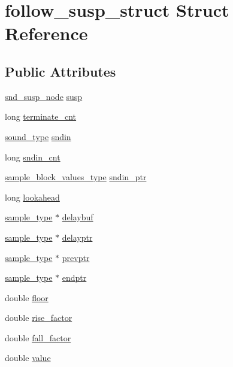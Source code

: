 \hypertarget{structfollow__susp__struct}{}\section{follow\+\_\+susp\+\_\+struct Struct Reference}
\label{structfollow__susp__struct}
\subsection*{Public Attributes}
\begin{DoxyCompactItemize}
\item 
\hyperlink{sound_8h_a6b268203688a934bd798ceb55f85d4c0}{snd\+\_\+susp\+\_\+node} \hyperlink{structfollow__susp__struct_ac51c0fb5911928ba83ecb7097f8e0eee}{susp}
\item 
long \hyperlink{structfollow__susp__struct_a77ca1631afba1cb5d86280656b045410}{terminate\+\_\+cnt}
\item 
\hyperlink{sound_8h_a792cec4ed9d6d636d342d9365ba265ea}{sound\+\_\+type} \hyperlink{structfollow__susp__struct_ae56ef75cea96a2a26645b43503b43265}{sndin}
\item 
long \hyperlink{structfollow__susp__struct_a8fc3d5fcfd27c91cee6424092b56d0a5}{sndin\+\_\+cnt}
\item 
\hyperlink{sound_8h_a83d17f7b465d1591f27cd28fc5eb8a03}{sample\+\_\+block\+\_\+values\+\_\+type} \hyperlink{structfollow__susp__struct_a57dbccd0134c2f5a1bcd201b476c287a}{sndin\+\_\+ptr}
\item 
long \hyperlink{structfollow__susp__struct_acb8ad8c0ca23df686025ce4b87171f6f}{lookahead}
\item 
\hyperlink{sound_8h_a3a9d1d4a1c153390d2401a6e9f71b32c}{sample\+\_\+type} $\ast$ \hyperlink{structfollow__susp__struct_a0a3d71a1b8092324b28f9fe60dc8329a}{delaybuf}
\item 
\hyperlink{sound_8h_a3a9d1d4a1c153390d2401a6e9f71b32c}{sample\+\_\+type} $\ast$ \hyperlink{structfollow__susp__struct_ae5eb59ac43a7f67c24d5a16eb7b160ad}{delayptr}
\item 
\hyperlink{sound_8h_a3a9d1d4a1c153390d2401a6e9f71b32c}{sample\+\_\+type} $\ast$ \hyperlink{structfollow__susp__struct_a563cae310bbd66e2d4d43e9cc0b40cd0}{prevptr}
\item 
\hyperlink{sound_8h_a3a9d1d4a1c153390d2401a6e9f71b32c}{sample\+\_\+type} $\ast$ \hyperlink{structfollow__susp__struct_ad76937ce8ce051fb46e62a930ccdd22f}{endptr}
\item 
double \hyperlink{structfollow__susp__struct_af87c139a37c84d9032dfe5c14d902b27}{floor}
\item 
double \hyperlink{structfollow__susp__struct_a2c9f86c190ab2b41aa0fa9c711ebd4a2}{rise\+\_\+factor}
\item 
double \hyperlink{structfollow__susp__struct_a82bfa1dafe6ee3f812a5eb7095650eae}{fall\+\_\+factor}
\item 
double \hyperlink{structfollow__susp__struct_a632581f65114e7a2f6df5c9a588784e2}{value}
\end{DoxyCompactItemize}


